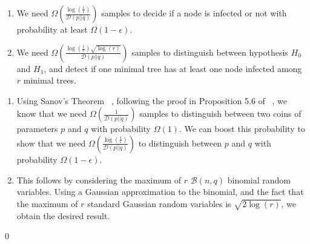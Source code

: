 \begin{lemma} \label{cl:samples} 
\begin{enumerate}
\item We need $\Omega \left(  \frac{\log\left(\frac{1}{\epsilon}\right)}{\mathcal{D}(p||q)} \right)$ samples to decide if a node is infected or not with probability at least $\Omega \left( 1 - \epsilon \right)$.
\item We need $\Omega \left(  \frac{\log\left(\frac{1}{\epsilon}\right) \sqrt{\log(r)}}{\mathcal{D}(p||q)} \right)$ samples to distinguish between hypothesis $H_0$ and $H_1$, and detect if one minimal tree has at least one node infected among $r$ minimal trees.
\end{enumerate}

\proof \begin{enumerate}
\item Using Sanov's Theorem ~\cite{Sanov1961}, following the proof in Proposition 5.6 of ~\cite{Mansour2011}, we know that we need $\Omega\left(\frac{1}{\mathcal{D}(p||q)}\right)$ samples to distinguish between two coins of parameters $p$ and $q$ with probability $\Omega(1)$. We can boost this probability to show that we need  $\Omega \left(  \frac{\log\left(\frac{1}{\epsilon}\right)}{\mathcal{D}(p||q)} \right)$ to distinguish between $p$ and $q$ with probability $\Omega \left( 1 - \epsilon \right)$.
\item This follows by considering the maximum of $r$ $\mathcal{B}(n,q)$ binomial random variables. Using a Gaussian approximation to the binomial, and the fact that the maximum of $r$ standard Gaussian random variables is $\sqrt{2 \log(r)}$, we obtain the desired result. 
\end{enumerate}
\qed
\end{lemma}


